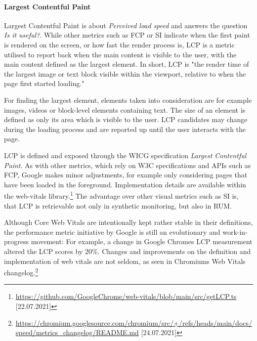 


\paragraph{Largest Contentful Paint}


Largest Contentful Paint is about \textit{Perceived load speed} and answers the question \textit{Is it useful?}.
While other metrics such as FCP or SI indicate when the first paint is rendered on the screen, or how fast the render process is, LCP is a metric utilised to report back when the main content is visible to the user, with the main content defined as the largest element.
In short, LCP is "the render time of the largest image or text block visible within the viewport, relative to when the page first started loading." %

For finding the largest element, elements taken into consideration are for example images, videos or block-level elements containing text.
The size of an element is defined as only its area which is visible to the user.
LCP candidates may change during the loading process and are reported up until the user interacts with the page.

LCP is defined and exposed through the WICG specification \textit{Largest Contentful Paint}.
As with other metrics, which rely on W3C specifications and APIs such as FCP, Google makes minor adjustments, for example only considering pages that have been loaded in the foreground.
Implementation details are available within the web-vitals library.\footnote{\url{https://github.com/GoogleChrome/web-vitals/blob/main/src/getLCP.ts} [22.07.2021]}
The advantage over other visual metrics such as SI is, that LCP is retrievable not only in synthetic monitoring, but also in RUM.



Although Core Web Vitals are intentionally kept rather stable in their definitions, the performance metric initiative by Google is still an evolutionary and work-in-progress movement:
For example, a change in Google Chromes LCP measurement altered the LCP scores by 20\%. %
Changes and improvements on the definition and implementation of web vitals are not seldom, as seen in Chromiums Web Vitals changelog.\footnote{\url{https://chromium.googlesource.com/chromium/src/+/refs/heads/main/docs/speed/metrics_changelog/README.md} [24.07.2021]}


